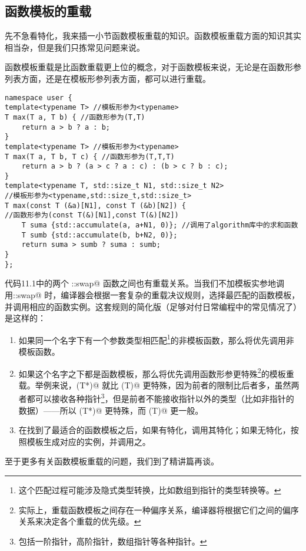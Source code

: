\subsection*{函数模板的重载}
先不急看特化，我来插一小节函数模板重载的知识。函数模板重载方面的知识其实相当杂，但是我们只拣常见问题来说。\par
函数模板重载是比函数重载更上位的概念，对于函数模板来说，无论是在函数形参列表方面，还是在模板形参列表方面，都可以进行重载。\par
\begin{lstlisting}
namespace user {
template<typename T> //模板形参为<typename>
T max(T a, T b) { //函数形参为(T,T)
    return a > b ? a : b;
}
template<typename T> //模板形参为<typename>
T max(T a, T b, T c) { //函数形参为(T,T,T)
    return a > b ? (a > c ? a : c) : (b > c ? b : c);
}
template<typename T, std::size_t N1, std::size_t N2>
//模板形参为<typename,std::size_t,std::size_t>
T max(const T (&a)[N1], const T (&b)[N2]) {
//函数形参为(const T(&)[N1],const T(&)[N2])
    T suma {std::accumulate(a, a+N1, 0)}; //调用了algorithm库中的求和函数
    T sumb {std::accumulate(b, b+N2, 0)};
    return suma > sumb ? suma : sumb;
}
};
\end{lstlisting}\par
代码11.1中的两个 \lstinline@user::swap@ 函数之间也有重载关系。当我们不加模板实参地调用\newline\lstinline@user::swap@ 时，编译器会根据一套复杂的重载决议规则，选择最匹配的函数模板，并调用相应的函数实例。这套规则的简化版（足够对付日常编程中的常见情况了）是这样的：
\begin{enumerate}
    \item 如果同一个名字下有一个参数类型相匹配\footnote{这个匹配过程可能涉及隐式类型转换，比如数组到指针的类型转换等。}的非模板函数，那么将优先调用非模板函数。
    \item 如果这个名字之下都是函数模板，那么将优先调用函数形参更特殊\footnote{实际上，重载函数模板之间存在一种偏序关系，编译器将根据它们之间的偏序关系来决定各个重载的优先级。}的模板重载。举例来说，\lstinline@fun(T*)@ 就比 \lstinline@fun(T)@ 更特殊，因为前者的限制比后者多，虽然两者都可以接收各种指针\footnote{包括一阶指针，高阶指针，数组指针等各种指针。}，但是前者不能接收指针以外的类型（比如非指针的数据）——所以 \lstinline@fun(T*)@ 更特殊，而 \lstinline@fun(T)@ 更一般。
    \item 在找到了最适合的函数模板之后，如果有特化，调用其特化；如果无特化，按照模板生成对应的实例，并调用之。
\end{enumerate}\par
至于更多有关函数模板重载的问题，我们到了精讲篇再谈。\par
